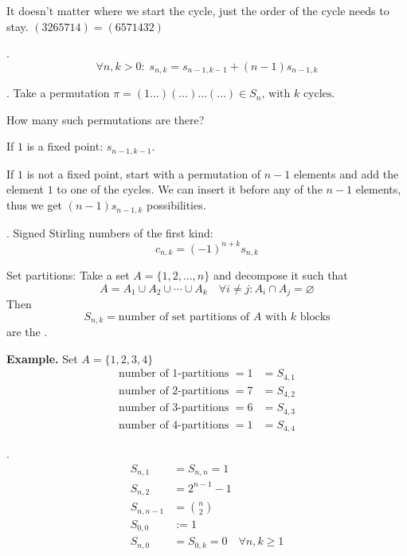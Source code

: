 It doesn't matter where we start the cycle, just the order of the cycle needs to stay. $(3 2 6 5 7 1 4) = (6 5 7 1 4 3 2)$

\Theorem.
\[
  \forall n,k > 0:\;
  s_{n,k} = s_{n-1,k-1} + (n-1)s_{n-1,k}
\]

\Proof.
Take a permutation 
$\pi = (1 \ldots )(\ldots) \ldots (\ldots) \in S_n \text{, with $k$ cycles}$.

How many such permutations are there?

\begin{compactitem}
  \item If $1$ is a fixed point: $s_{n-1, k-1}$.

  \item If $1$ is not a fixed point, start with a permutation of $n-1$ elements and add the element $1$ to one of the cycles. We can insert it before any of the $n-1$ elements, thus we get
$(n-1) s_{n-1,k}$ possibilities.
\end{compactitem}

\Remark.
Signed Stirling numbers of the first kind:
\[
  c_{n,k} = (-1)^{n+k} s_{n,k}
\]

\begin{definition}
Set partitions: 
Take a set $A=\{1,2, \ldots, n\}$
and decompose it such that
\[
  A = A_1 \cup A_2 \cup \cdots\cup A_k
  \quad
  \forall i\neq j: A_i \cap A_j = \varnothing
\]
Then
\[
  S_{n,k} = \text{number of set partitions of $A$ with $k$ blocks}
\]
are the .
\end{definition}

\textbf{Example.}
Set $A = \{1,2,3,4\}$
\begin{align*}
  \text{number of 1-partitions }= 1 &= S_{4,1}\\
  \text{number of 2-partitions }= 7 &= S_{4,2}\\
  \text{number of 3-partitions }= 6 &= S_{4,3}\\
  \text{number of 4-partitions }= 1 &= S_{4,4}
\end{align*}

\Remark.
\begin{align*}
  S_{n,1} &= S_{n,n} = 1 \\
  S_{n,2} &= 2^{n-1}-1 \\
  S_{n,n-1} &= {n\choose 2} \\
  S_{0,0} &:= 1 \\
  S_{n,0} &= S_{0,k} = 0
    \quad\forall n,k ≥ 1
\end{align*}

